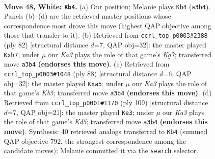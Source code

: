 \documentclass[11pt]{article}
\begin{document}
\clearpage

\begin{figure}[p]\centering
\begin{subfigure}{0.46\textwidth}\centering
\resizebox{\linewidth}{!}{%
\newchessgame
\chessboard[
  setfen={7k/3q4/8/8/2p2P2/KpP5/8/8 w - - 0 48},
  showmover=false,
  pgfstyle=straightmove, color=movearrow, markmove={a3-b4}
]}
\caption{}
\end{subfigure}\hfill
\begin{subfigure}{0.46\textwidth}\centering
\resizebox{\linewidth}{!}{%
\newchessgame
\chessboard[
  setfen={8/6Kp/6p1/p5P1/8/7P/k7/8 w - - 0 42},
  showmover=false,
  pgfstyle=straightmove, color=movearrow, markmove={g7-h7}
]}
\caption{}
\end{subfigure}
\\[4pt]
\begin{subfigure}{0.46\textwidth}\centering
\resizebox{\linewidth}{!}{%
\newchessgame
\chessboard[
  setfen={8/8/3k4/pK5p/1p6/8/P6P/8 w - - 2 45},
  showmover=false,
  pgfstyle=straightmove, color=movearrow, markmove={b5-a5}
]}
\caption{}
\end{subfigure}\hfill
\begin{subfigure}{0.46\textwidth}\centering
\resizebox{\linewidth}{!}{%
\newchessgame
\chessboard[
  setfen={8/8/p7/8/2Pk1p2/1P6/2K5/8 b - - 1 55},
  showmover=false,
  pgfstyle=straightmove, color=movearrow, markmove={d4-e3}
]}
\caption{}
\end{subfigure}
\caption{\textbf{Move 48, White: \texttt{Kb4}.} (a) Our position; Melanie plays \texttt{Kb4} (\texttt{a3b4}). Panels (b)--(d) are the retrieved master positions whose correspondence most drove this move (highest QAP objective among those that transfer to it). (b) Retrieved from \texttt{ccrl\_top\_p0003\#2388} (ply 82) [structural distance $d$=7, QAP obj=32]: the master played \texttt{Kxh7}; under $\mu$ our \emph{Ka3} plays the role of that game's \emph{Kg7}; transferred move \texttt{a3b4} \textbf{(endorses this move)}. (c) Retrieved from \texttt{ccrl\_top\_p0003\#1048} (ply 88) [structural distance $d$=6, QAP obj=32]: the master played \texttt{Kxa5}; under $\mu$ our \emph{Ka3} plays the role of that game's \emph{Kb5}; transferred move \texttt{a3b4} \textbf{(endorses this move)}. (d) Retrieved from \texttt{ccrl\_top\_p0001\#1170} (ply 109) [structural distance $d$=7, QAP obj=21]: the master played \texttt{Ke3}; under $\mu$ our \emph{Ka3} plays the role of that game's \emph{Kd5}; transferred move \texttt{a3b4} \textbf{(endorses this move)}. Synthesis: 40 retrieved analogs transferred to \texttt{Kb4} (summed QAP objective 792, the strongest correspondence among the candidate moves); Melanie committed it via the \texttt{search} selector.}
\label{fig:thought-m94}
\end{figure}
\end{document}
